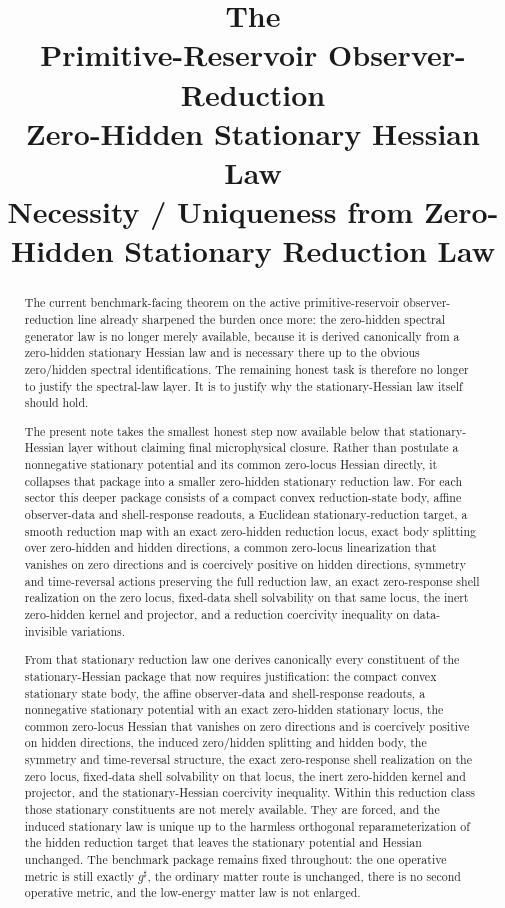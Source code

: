 \documentclass[11pt]{article}
\title{\textbf{The \TheoryName{}}\\[0.4em]
\large Primitive-Reservoir Observer-Reduction\\
\large Zero-Hidden Stationary Hessian Law\\
\large Necessity / Uniqueness from Zero-Hidden Stationary Reduction Law}
\author{}
\date{}
\newcommand{\CompletedMetric}{g^{\sharp}}
\begin{document}
\maketitle

\begin{abstract}
The current benchmark-facing theorem on the active primitive-reservoir observer-reduction line already sharpened the burden once more: the zero-hidden spectral generator law is no longer merely available, because it is derived canonically from a zero-hidden stationary Hessian law and is necessary there up to the obvious zero/hidden spectral identifications. The remaining honest task is therefore no longer to justify the spectral-law layer. It is to justify why the stationary-Hessian law itself should hold.

The present note takes the smallest honest step now available below that stationary-Hessian layer without claiming final microphysical closure. Rather than postulate a nonnegative stationary potential and its common zero-locus Hessian directly, it collapses that package into a smaller zero-hidden stationary reduction law. For each sector this deeper package consists of a compact convex reduction-state body, affine observer-data and shell-response readouts, a Euclidean stationary-reduction target, a smooth reduction map with an exact zero-hidden reduction locus, exact body splitting over zero-hidden and hidden directions, a common zero-locus linearization that vanishes on zero directions and is coercively positive on hidden directions, symmetry and time-reversal actions preserving the full reduction law, an exact zero-response shell realization on the zero locus, fixed-data shell solvability on that same locus, the inert zero-hidden kernel and projector, and a reduction coercivity inequality on data-invisible variations.

From that stationary reduction law one derives canonically every constituent of the stationary-Hessian package that now requires justification: the compact convex stationary state body, the affine observer-data and shell-response readouts, a nonnegative stationary potential with an exact zero-hidden stationary locus, the common zero-locus Hessian that vanishes on zero directions and is coercively positive on hidden directions, the induced zero/hidden splitting and hidden body, the symmetry and time-reversal structure, the exact zero-response shell realization on the zero locus, fixed-data shell solvability on that locus, the inert zero-hidden kernel and projector, and the stationary-Hessian coercivity inequality. Within this reduction class those stationary constituents are not merely available. They are forced, and the induced stationary law is unique up to the harmless orthogonal reparameterization of the hidden reduction target that leaves the stationary potential and Hessian unchanged. The benchmark package remains fixed throughout: the one operative metric is still exactly \(\CompletedMetric\), the ordinary matter route is unchanged, there is no second operative metric, and the low-energy matter law is not enlarged.
\end{abstract}
\end{document}
